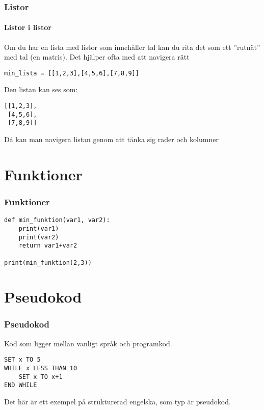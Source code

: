 \documentclass[aspectratio=169]{beamer}
\begin{document}
\begin{frame}[fragile]
	\frametitle{Listor}
	\framesubtitle{Listor i listor}

	Om du har en lista med listor som innehåller tal kan du rita det som ett ''rutnät'' med tal (en matris). Det hjälper ofta med att navigera rätt
	
	\begin{lstlisting}
min_lista = [[1,2,3],[4,5,6],[7,8,9]]
	\end{lstlisting}
	
	Den listan kan ses som:
	
	\begin{lstlisting}
[[1,2,3],
 [4,5,6],
 [7,8,9]]
	\end{lstlisting}
	
	Då kan man navigera listan genom att tänka sig rader och kolumner

\end{frame}

\section{Funktioner}

\begin{frame}[fragile]
	\frametitle{Funktioner}
	
	\begin{lstlisting}
def min_funktion(var1, var2):
    print(var1)
    print(var2)
    return var1+var2
    
print(min_funktion(2,3))
	\end{lstlisting}
	
\end{frame}

\section{Pseudokod}

\begin{frame}[fragile]
	\frametitle{Pseudokod}
	
	Kod som ligger mellan vanligt språk och programkod.
	
	\begin{lstlisting}
SET x TO 5
WHILE x LESS THAN 10
    SET x TO x+1
END WHILE
	\end{lstlisting}
	
	Det här är ett exempel på strukturerad engelska, som typ är pseudokod.
	
\end{frame}
\end{document}
